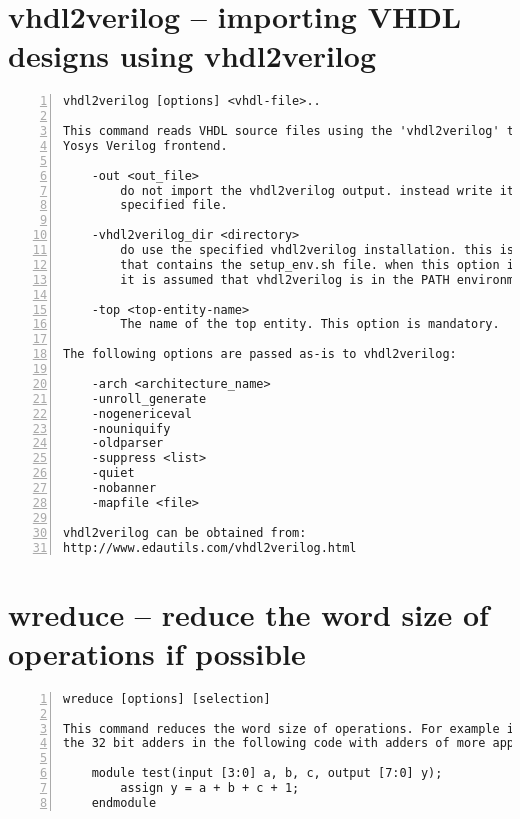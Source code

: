 \section{vhdl2verilog -- importing VHDL designs using vhdl2verilog}
\label{cmd:vhdl2verilog}
\begin{lstlisting}[numbers=left,frame=single]
    vhdl2verilog [options] <vhdl-file>..

This command reads VHDL source files using the 'vhdl2verilog' tool and the
Yosys Verilog frontend.

    -out <out_file>
        do not import the vhdl2verilog output. instead write it to the
        specified file.

    -vhdl2verilog_dir <directory>
        do use the specified vhdl2verilog installation. this is the directory
        that contains the setup_env.sh file. when this option is not present,
        it is assumed that vhdl2verilog is in the PATH environment variable.

    -top <top-entity-name>
        The name of the top entity. This option is mandatory.

The following options are passed as-is to vhdl2verilog:

    -arch <architecture_name>
    -unroll_generate
    -nogenericeval
    -nouniquify
    -oldparser
    -suppress <list>
    -quiet
    -nobanner
    -mapfile <file>

vhdl2verilog can be obtained from:
http://www.edautils.com/vhdl2verilog.html
\end{lstlisting}

\section{wreduce -- reduce the word size of operations if possible}
\label{cmd:wreduce}
\begin{lstlisting}[numbers=left,frame=single]
    wreduce [options] [selection]

This command reduces the word size of operations. For example it will replace
the 32 bit adders in the following code with adders of more appropriate widths:

    module test(input [3:0] a, b, c, output [7:0] y);
        assign y = a + b + c + 1;
    endmodule
\end{lstlisting}

